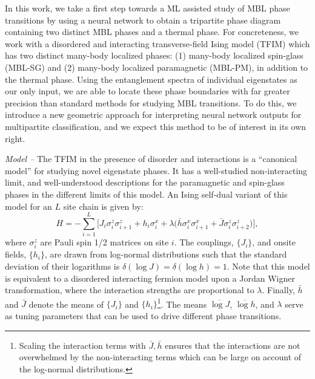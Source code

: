 \documentclass[amsmath,amssymb, aps, prb, superscriptaddress,twocolumn]{revtex4-1}
\begin{document}
In this work, we take a first step towards a ML assisted study of MBL phase transitions  by using a neural network to obtain a tripartite phase diagram containing two distinct MBL phases and a thermal phase. For concreteness, we work with a disordered and interacting transverse-field Ising model (TFIM) which has two distinct many-body localized phases: 
 (1) many-body localized spin-glass (MBL-SG) and (2)  many-body  localized  paramagnetic  (MBL-PM), in addition to the thermal phase. 
 Using the entanglement spectra of individual eigenstates as our only input, we are able to locate these phase boundaries with far greater precision than standard methods for studying MBL transitions.  To do this, we introduce a new geometric approach for interpreting neural network outputs for multipartite classification, and we expect this method to be of interest in its own right.  

{\it Model -- }The TFIM in the presence of disorder and interactions is a ``canonical model'' for studying novel eigenstate phases\cite{Huse13, PekkerHilbertGlass, Kjall14}. It has a well-studied non-interacting limit\cite{Fisher95}, and well-understood descriptions for the paramagnetic and spin-glass phases in the different limits of this model. An Ising self-dual variant of this model for an $L$ site chain is given by\cite{Moudgalya2017}: 
\begin{equation}
H = - \sum\limits_{i=1}^L \Big[ J_i \sigma_i^z \sigma_{i+1}^z + h_i \sigma_i^x 
 + \lambda \big(\bar{h}\sigma_i^x \sigma_{i+1}^x + \bar{J}\sigma_i^z \sigma_{i+2}^z\big) \Big],
\label{eq:model}
\end{equation}
where $\sigma_i^z$ are Pauli spin 1/2 matrices on site $i$. 
The couplings, $\{J_i\}$, and onsite fields, $\{h_i\}$, are drawn from log-normal distributions such that the standard deviation of their logarithms is $\delta(\log J) = \delta(\log h) = 1$. Note that this model is equivalent to a disordered interacting fermion model upon a Jordan Wigner transformation, where the interaction strengths are proportional to $\lambda$. Finally, $\bar{h}$ and $\bar{J}$ denote the means of $\{J_i\}$ and $\{h_i\}$\footnote{Scaling the interaction terms with $\bar{J}, \bar{h}$ ensures that 
the interactions are not overwhelmed by the non-interacting terms which can be large on account of the log-normal distributions.}. 
The means $\overline{\log J}$,  $\overline{\log h}$, %
and $\lambda$ serve as tuning parameters that can be used to drive different phase transitions. 
\end{document}
